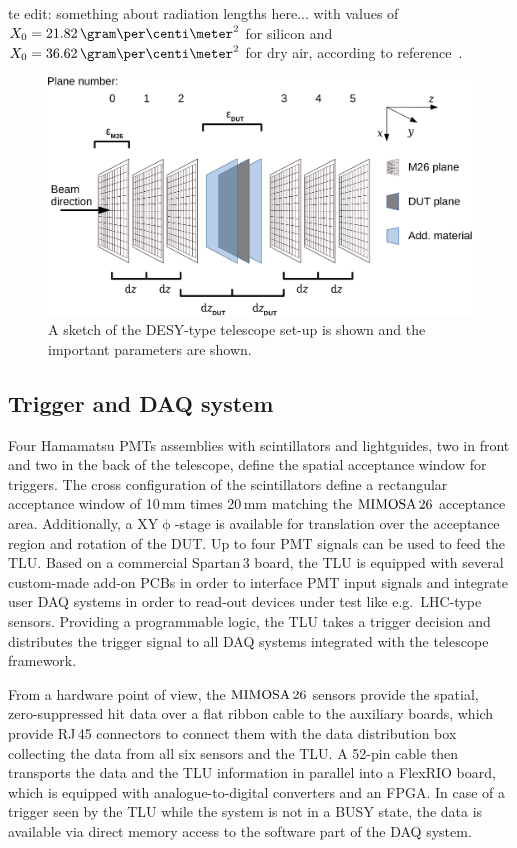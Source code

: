 te edit: something about radiation lengths here...
\label{ref:radiationlengths}
with values of $X_0 = 21.82\,\allowbreak\gram\per\centi\meter^2$ for silicon and $X_0 = 36.62\,\gram\per\centi\meter^2$ for dry air, according to reference~\cite{ref:x0values}.


\begin{figure}[tb]
	\center
	\includegraphics[width=.9\textwidth]{figures/sketch_tscope4}
	\caption[A sketch of the DESY-type telescope set-up]{A sketch of the DESY-type telescope set-up is shown and the important parameters are shown.}
	\label{fig:datura_sketch}
\end{figure}

\subsection{Trigger and DAQ system}

Four Hamamatsu PMTs assemblies with scintillators and lightguides, two in front and two in the back of the telescope, define the spatial acceptance window for triggers. 
The cross configuration of the scintillators define a rectangular acceptance window of 10\,mm times 20\,mm matching the $\textrm{MIMOSA\,26}$ acceptance area. 
Additionally, a XY$\upphi$-stage is available for translation over the acceptance region and rotation of the DUT. 
Up to four PMT signals can be used to feed the TLU. 
Based on a commercial Spartan\,3 board, the TLU is equipped with several custom-made add-on PCBs in order to interface PMT input signals
 and integrate user DAQ systems in order to read-out devices under test like e.g.~LHC-type sensors. 
Providing a programmable logic, the TLU  takes a trigger decision and distributes the trigger signal to all DAQ systems integrated with the telescope framework.

From a hardware point of view, the $\textrm{MIMOSA\,26}$ sensors provide the spatial, zero-suppressed hit data over a flat ribbon cable to the auxiliary boards, which provide RJ\,45 connectors to connect them with the
 data distribution box collecting the data from all six sensors and the TLU. 
A 52-pin cable then transports the data and the TLU information in parallel into a FlexRIO board, which is equipped with analogue-to-digital converters and an FPGA. 
In case of a trigger seen by the TLU while the system is not in a BUSY state, the data is available via direct memory access to the software part of the DAQ system. 

